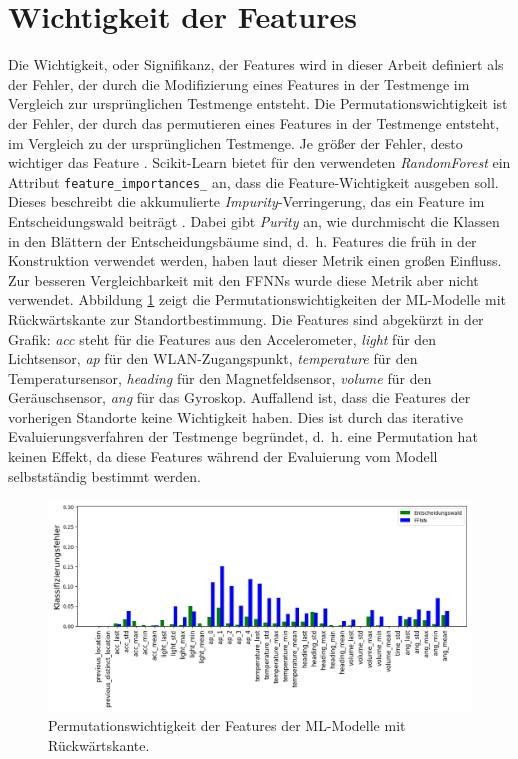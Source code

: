 \newpage
\section{Wichtigkeit der Features}
\label{sec:eval_feature_importance}
Die Wichtigkeit, oder Signifikanz, der Features wird in dieser Arbeit definiert als der Fehler,
der durch die Modifizierung eines Features in der Testmenge im Vergleich zur ursprünglichen Testmenge entsteht.
Die Permutationswichtigkeit ist der Fehler, der durch das permutieren eines Features in der Testmenge entsteht, im Vergleich zu der ursprünglichen Testmenge.
Je größer der Fehler, desto wichtiger das Feature \cite{breiman2001random}.
\newline
\newline
Scikit-Learn bietet für den verwendeten \textit{RandomForest} ein Attribut \texttt{feature\_importances\_} an, dass die Feature-Wichtigkeit ausgeben soll.
Dieses beschreibt die akkumulierte \textit{Impurity}-Verringerung, das ein Feature im Entscheidungswald beiträgt \cite{ScikitLearnFeatureImportance}.
Dabei gibt \textit{Purity} an, wie durchmischt die Klassen in den Blättern der Entscheidungsbäume sind,
d.~h. Features die früh in der Konstruktion verwendet werden, haben laut dieser Metrik einen großen Einfluss.
Zur besseren Vergleichbarkeit mit den FFNNs wurde diese Metrik aber nicht verwendet.
\newline
\newline
Abbildung \ref{fig:fi_consolidated} zeigt die Permutationswichtigkeiten der ML-Modelle mit Rückwärtskante zur Standortbestimmung.
Die Features sind abgekürzt in der Grafik: \textit{acc} steht für die Features aus den Accelerometer, \textit{light} für den Lichtsensor, \textit{ap} für den WLAN-Zugangspunkt,
\textit{temperature} für den Temperatursensor, \textit{heading} für den Magnetfeldsensor, \textit{volume} für den Geräuschsensor, \textit{ang} für das Gyroskop.
\newpage
Auffallend ist, dass die Features der vorherigen Standorte keine Wichtigkeit haben.
Dies ist durch das iterative Evaluierungsverfahren der Testmenge begründet,
d.~h. eine Permutation hat keinen Effekt, da diese Features während der Evaluierung vom Modell selbstständig bestimmt werden.
\begin{figure}[h!]
    \centering
    \includegraphics[width=\linewidth]{images/fi_consolidated.png}
    \caption{Permutationswichtigkeit der Features der ML-Modelle mit Rückwärtskante.}
    \label{fig:fi_consolidated}
\end{figure}

